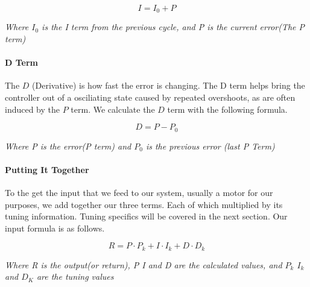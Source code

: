 \documentclass{article}
\begin{document}
    $$ I = I_0 + P$$
    \begin{center}\em{Where $I_0$ is the I term from the previous cycle, and P is the current error(The P term)}\end{center}

\paragraph{D Term}
    The $D$ (Derivative) is how fast the error is changing. The D term helps bring the controller out of a osciliating state caused by repeated overshoots, as are often induced by the $P$ term. We calculate the $D$ term with the following formula.

    $$D = P - P_0$$
    \begin{center}\em{Where P is the error(P term) and $P_0$ is the previous error (last P Term)}\end{center}

\paragraph{Putting It Together}
    To the get the input that we feed to our system, usually a motor for our purposes, we add together our three terms. Each of which multiplied by its tuning information. Tuning specifics will be covered in the next section. Our input formula is as follows.

    $$ R = P \cdot P_k + I \cdot I_k + D \cdot D_k$$
    \begin{center}
        \em{Where R is the output(or return), P I and D are the calculated values, and $P_k$ $I_k$ and $D_K$ are the tuning values}
    \end{center}
\end{document}
